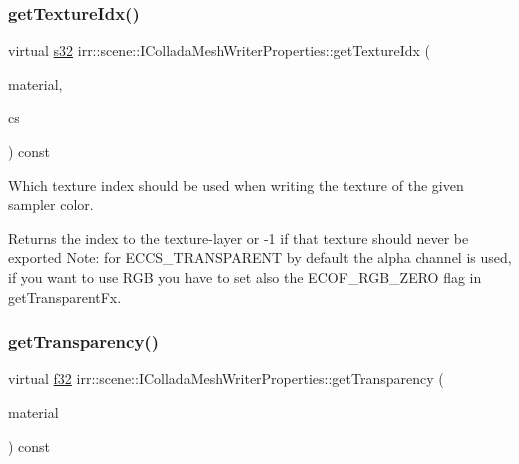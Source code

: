 \subsubsection{\texorpdfstring{get\+Texture\+Idx()}{getTextureIdx()}}
{\footnotesize\ttfamily virtual \hyperlink{namespaceirr_ac66849b7a6ed16e30ebede579f9b47c6}{s32} irr\+::scene\+::\+I\+Collada\+Mesh\+Writer\+Properties\+::get\+Texture\+Idx (\begin{DoxyParamCaption}\item[{const \hyperlink{classirr_1_1video_1_1SMaterial}{video\+::\+S\+Material} \&}]{material,  }\item[{\hyperlink{namespaceirr_1_1scene_a6204218341c6b449d879cd8367b2f8d8}{E\+\_\+\+C\+O\+L\+L\+A\+D\+A\+\_\+\+C\+O\+L\+O\+R\+\_\+\+S\+A\+M\+P\+L\+ER}}]{cs }\end{DoxyParamCaption}) const\hspace{0.3cm}{\ttfamily [pure virtual]}}



Which texture index should be used when writing the texture of the given sampler color. 

\begin{DoxyReturn}{Returns}
the index to the texture-\/layer or -\/1 if that texture should never be exported Note\+: for E\+C\+C\+S\+\_\+\+T\+R\+A\+N\+S\+P\+A\+R\+E\+NT by default the alpha channel is used, if you want to use R\+GB you have to set also the E\+C\+O\+F\+\_\+\+R\+G\+B\+\_\+\+Z\+E\+RO flag in get\+Transparent\+Fx. 
\end{DoxyReturn}
\mbox{\label{classirr_1_1scene_1_1IColladaMeshWriterProperties_ac547e1f89f4655751ecd570ad70d010b}} 
\subsubsection{\texorpdfstring{get\+Transparency()}{getTransparency()}}
{\footnotesize\ttfamily virtual \hyperlink{namespaceirr_a0277be98d67dc26ff93b1a6a1d086b07}{f32} irr\+::scene\+::\+I\+Collada\+Mesh\+Writer\+Properties\+::get\+Transparency (\begin{DoxyParamCaption}\item[{const \hyperlink{classirr_1_1video_1_1SMaterial}{video\+::\+S\+Material} \&}]{material }\end{DoxyParamCaption}) const\hspace{0.3cm}{\ttfamily [pure virtual]}}



